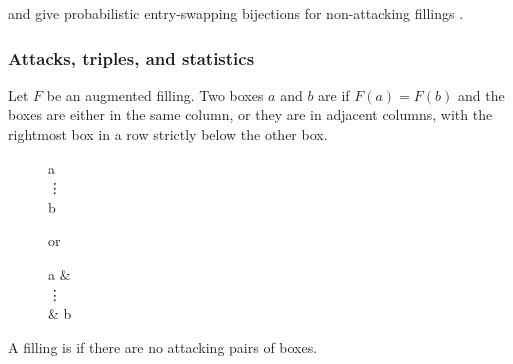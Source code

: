  and  give
probabilistic entry-swapping bijections for non-attacking fillings
\cite{MouraMandelshtam2025x}.

\subsubsection[permutedBasementFillingStatistics]{Attacks, triples, and statistics}

\begin{definition}
Let $F$ be an augmented filling. Two boxes $a$ and $b$ are
\label{attackingBoxes}
if $F(a)=F(b)$ and the boxes are either in the same column,
or they are in adjacent columns, with the rightmost box in a row strictly below
the other box.

\begin{figure}
\begin{ytableau}
a  \\
\none\vdots \\
b  \\
\end{ytableau}
or
\begin{ytableau}
 a & \none \\
 \none\vdots \\
  & b \\
\end{ytableau}
\end{figure}

\end{definition}

A filling is \label{nonAttackingFillingMacdonald}
if there are no attacking pairs of boxes.


